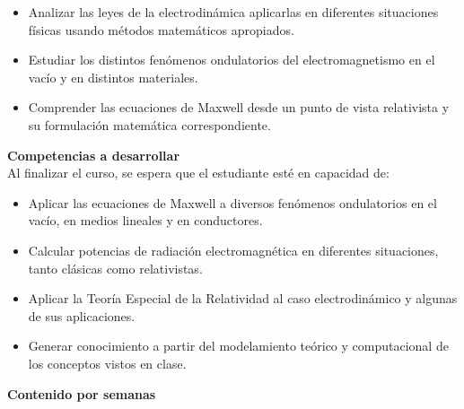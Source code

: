 \documentclass[letterpaper,10pt,onecolumn]{article}
\begin{document}
\begin{itemize}
	\item Analizar las leyes de la electrodin\'amica aplicarlas en
          diferentes situaciones f\'isicas usando m\'etodos
          matem\'aticos apropiados.\\[-0.6cm] 
	\item Estudiar los distintos fen\'omenos ondulatorios del
          electromagnetismo en el vac\'io y en distintos
          materiales.\\[-0.6cm] 
	\item Comprender las ecuaciones de Maxwell desde un punto de
          vista relativista y su formulaci\'on matem\'atica
          correspondiente.\\[-0.2cm] 
\end{itemize}

\noindent\textbf{\large {} \quad Competencias a
  desarrollar}\\[-0.2cm] 


\noindent\normalsize Al finalizar el curso, se espera que el
estudiante est\'e en capacidad de: 

\begin{itemize}
	\item Aplicar las ecuaciones de Maxwell a diversos fen\'omenos
          ondulatorios en el vac\'io, en medios lineales y en
          conductores.\\[-0.6cm]
	\item Calcular potencias de radiaci\'on electromagn\'etica en
          diferentes situaciones, tanto cl\'asicas como
          relativistas.\\[-0.6cm] 
	\item Aplicar la Teor\'ia Especial de la Relatividad al caso
          electrodin\'amico y algunas de sus aplicaciones.\\[-0.6cm] 
	\item Generar conocimiento a partir del modelamiento te\'orico
          y computacional de los conceptos vistos en clase.\\[-0.2cm] 
\end{itemize}

\noindent\textbf{\large {} \quad Contenido por
  semanas}\\[-0.2cm] 

\end{document}
